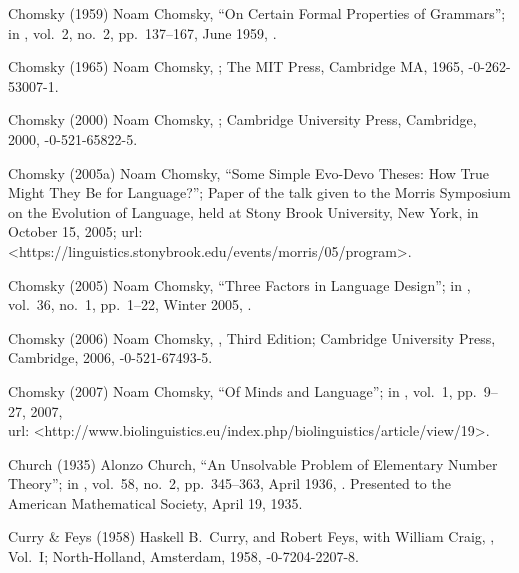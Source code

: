  Chomsky (1959)
Noam Chomsky,
``On Certain Formal Properties of Grammars'';
in ,
vol.\ 2, no.\ 2, pp.\ 137--167, June 1959,
.

 Chomsky (1965)
Noam Chomsky,
;
The MIT Press, Cambridge MA, 1965,
-0-262-53007-1.

 Chomsky (2000)
Noam Chomsky,
;
Cambridge University Press, Cambridge, 2000,
-0-521-65822-5.

 Chomsky (2005a)
Noam Chomsky,
``Some Simple Evo-Devo Theses:
 How True Might They Be for Language?'';
Paper of the talk given to the
Morris Symposium on the Evolution of Language,
held at Stony Brook University, New York,
in October 15, 2005;
{\sc url:}
\URL<https://linguistics.stonybrook.edu/events/morris/05/program>.

 Chomsky (2005)
Noam Chomsky,
``Three Factors in Language Design'';
in ,
vol.\ 36, no.\ 1, pp.\ 1--22, Winter 2005,
.

 Chomsky (2006)
Noam Chomsky,
, Third Edition;
Cambridge University Press, Cambridge, 2006,
-0-521-67493-5.

 Chomsky (2007)
Noam Chomsky,
``Of Minds and Language'';
in ,
vol.\ 1, pp.\ 9--27, 2007,\\
{\sc url:}
\URL<http://www.biolinguistics.eu/index.php/biolinguistics/article/view/19>.


 Church (1935)
Alonzo Church,
``An Unsolvable Problem of Elementary Number Theory'';
in ,
vol.\ 58, no.\ 2, pp.\ 345--363, April 1936,
.
Presented to the American Mathematical Society,
April 19, 1935.

 Curry \& Feys (1958)
Haskell B.\ Curry, and
Robert Feys, with
William  Craig,
, Vol.\ I;
North-Holland, Amsterdam, 1958,
-0-7204-2207-8.

